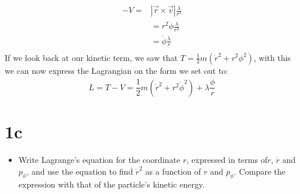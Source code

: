 \documentclass{report}
\begin{document}
\begin{align*}-V =&|\vec r \times \vec v|\frac{\lambda}{r^3}\\
&= r^2\dot \phi\frac{\lambda}{r^3}\\&=\dot \phi\frac{\lambda}{r}\\
\end{align*}
If we look back at our kinetic term, we saw that $T = \frac{1}{2}m(\dot r^2 + r^2\phi^2)$, with this we can now express the Lagrangian on the form we set out to:
\begin{equation} L = T-V= \frac{1}{2}m(\dot r^2 + r^2\dot\phi^2) + \lambda\frac{ \dot\phi}{r}\label{swag}\end{equation}
\clearpage
\section*{1c}
\begin{itemize}
\item
Write Lagrange\rq{}s equation for the coordinate $r$, expressed in terms of$\dot r$, $\ddot r$ and $p_\phi$, and use the equation to find $\dot r^2$  as a function of $r$ and $p_\phi$. Compare the expression with that of the particle\rq{}s kinetic energy.
\end{itemize}
\end{document}
